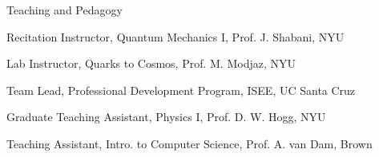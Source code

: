 \begin{cvlist_tight}{Teaching and Pedagogy}
\item[2021] Recitation Instructor, Quantum Mechanics I, Prof. J. Shabani, NYU
\item[2019] Lab Instructor, Quarks to Cosmos, Prof. M. Modjaz, NYU
\item[2018--2019] Team Lead, Professional Development Program, ISEE, UC Santa Cruz
\item[2018] Graduate Teaching Assistant, Physics I, Prof. D. W. Hogg, NYU
\item[2015] Teaching Assistant, Intro. to Computer Science, Prof. A. van Dam, Brown
\end{cvlist_tight}